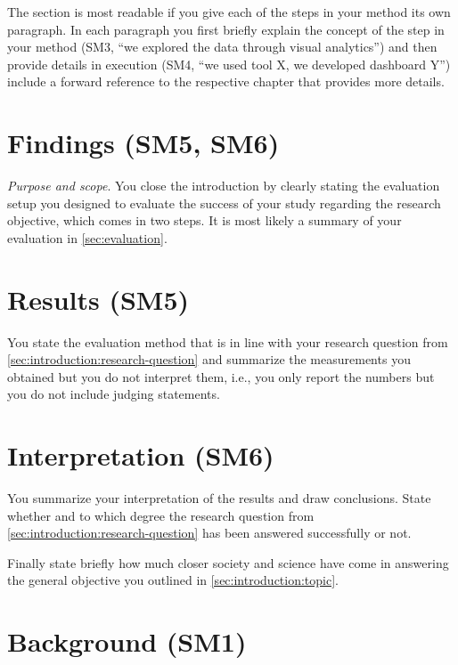 \documentclass[
  numbers=noenddot,
  english,  %
  a4paper,  %
  twoside,  %
  bibliography=totoc,
  headsepline,
  cleardoublepage=empty,
  parskip=half,
  draft=false
]{scrbook}
\theoremstyle{break}
\begin{document}
The section is most readable if you give each of the steps in your method its own paragraph.
In each paragraph you first briefly explain the concept of the step in your method (SM3, ``we explored the data through visual analytics'') and then provide details in execution (SM4, ``we used tool X, we developed dashboard Y'') include a forward reference to the respective chapter that provides more details.

\section{Findings (SM5, SM6)}\label{sec:introduction:results}

\emph{Purpose and scope}.
You close the introduction by clearly stating the evaluation setup you designed to evaluate the success of your study regarding the research objective, which comes in two steps.
It is most likely a summary of your evaluation in \cref{sec:evaluation}.

\section*{Results (SM5)}

You state the evaluation method that is in line with your research question from \cref{sec:introduction:research-question} and summarize the measurements you obtained but you do not interpret them, i.e., you only report the numbers but you do not include judging statements.

\section*{Interpretation (SM6)}

You summarize your interpretation of the results and draw conclusions.
State whether and to which degree the research question from \cref{sec:introduction:research-question} has been answered successfully or not.

Finally state briefly how much closer society and science have come in answering the general objective you outlined in \cref{sec:introduction:topic}.

\section{Background (SM1)}\label{sec:background}
\end{document}
